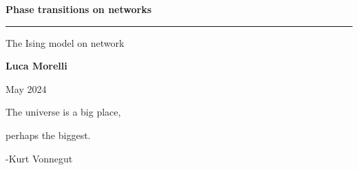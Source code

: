 \begin{titlepage}
	\vspace*{5cm}
	\begin{center}
	\huge \textbf{Phase transitions on networks}
	
	\rule{7cm}{0.4pt} 
	
	\LARGE The Ising model on network
	
	\vspace{40pt}
	
	\LARGE \textbf{Luca Morelli}
	
	\vspace{20pt}
	
	\LARGE May 2024
	
	\end{center}
   
   \vspace{200pt}
   
    \begin{flushright}
    	The universe is a big place, 

		perhaps the biggest.

        -Kurt Vonnegut
    \end{flushright}	
\end{titlepage}